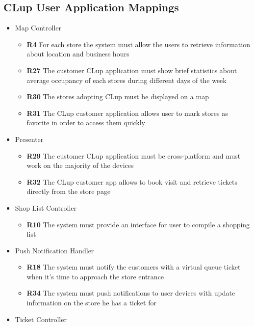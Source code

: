\subsection{CLup User Application Mappings}
\begin{itemize}
    \item Map Controller
    \begin{itemize}
        \item \textbf{R4} For each store the system must allow the users to retrieve information about location and business hours
        \item \textbf{R27} The customer CLup application must show brief statistics about average occupancy of each stores during different days of the week
        \item \textbf{R30} The stores adopting CLup must be displayed on a map    
        \item \textbf{R31} The CLup customer application allows user to mark stores as favorite in order to access them quickly
    \end{itemize}
    \item Presenter
    \begin{itemize}
        \item \textbf{R29} The customer CLup application must be cross-platform and must work on the majority of the devices
        \item \textbf{R32} The CLup customer app allows to book visit and retrieve tickets directly from the store page
    \end{itemize}
    \item Shop List Controller
    \begin{itemize}
        \item \textbf{R10} The system must provide an interface for user to compile a shopping list
    \end{itemize}
    \item Push Notification Handler
    \begin{itemize}
        \item \textbf{R18} The system must notify the customers with a virtual queue ticket when it’s time to approach the store entrance
        \item \textbf{R34} The system must push notifications to user devices with update information on the store he has a ticket for 
    \end{itemize}
    \item Ticket Controller
    \begin{itemize}

\end{itemize}
\end{itemize}
